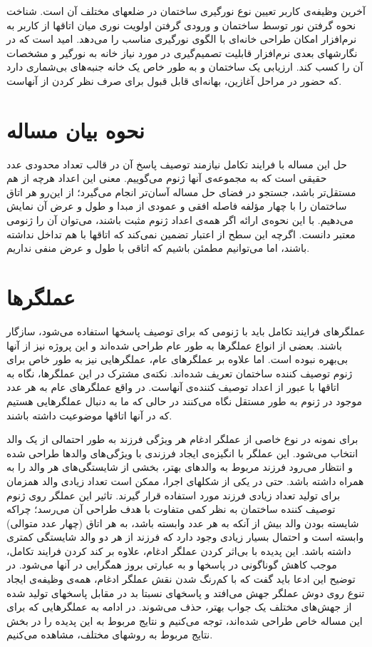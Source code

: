 \documentclass{report}
\begin{document}
آخرین وظیفه‌ی کاربر تعیین نوع نورگیری ساختمان در ضلعهای مختلف آن است. شناخت نحوه گرفتن نور توسط ساختمان و ورودی گرفتن اولویت نوری میان اتاقها از کاربر به نرم‌افزار امکان طراحی خانه‌ای با الگوی نورگیری مناسب را می‌دهد. امید است که در نگارشهای بعدی نرم‌افزار قابلیت تصمیم‌گیری در مورد نیاز خانه به نورگیر و مشخصات آن را کسب کند. ارزیابی یک ساختمان و به طور خاص یک خانه جنبه‌های بی‌شماری دارد که حضور در مراحل آغازین، بهانه‌ای قابل قبول برای صرف نظر کردن از آنهاست.

\section{نحوه بیان مساله}
حل این مساله با فرایند تکامل نیازمند توصیف پاسخ آن در قالب تعداد محدودی عدد حقیقی است که به مجموعه‌ی آنها ژنوم می‌گوییم. معنی این اعداد هرچه از هم مستقل‌تر باشد، جستجو در فضای حل مساله آسان‌تر انجام می‌گیرد؛ از این‌رو هر اتاق ساختمان را با چهار مؤلفه فاصله افقی و عمودی از مبدا و طول و عرض آن نمایش می‌دهیم. با این نحوه‌ی ارائه اگر همه‌ی اعداد ژنوم مثبت باشند، می‌توان آن را ژنومی معتبر دانست. اگرچه این سطح از اعتبار تضمین نمی‌کند که اتاقها با هم تداخل نداشته باشند، اما می‌توانیم مطمئن باشیم که اتاقی با طول و عرض منفی نداریم.

\section{عملگرها}
عملگرهای فرایند تکامل باید با ژنومی که برای توصیف پاسخها استفاده می‌شود، سازگار باشند. بعضی از انواع عملگرها به طور عام طراحی شده‌اند و این پروژه نیز از آنها بی‌بهره نبوده است. اما علاوه بر عملگرهای عام، عملگرهایی نیز به طور خاص برای ژنوم توصیف کننده ساختمان تعریف شده‌اند. نکته‌ی مشترک در این عملگرها، نگاه به اتاقها با عبور از اعداد توصیف کننده‌ی آنهاست. در واقع عملگرهای عام به هر عدد موجود در ژنوم به طور مستقل نگاه می‌کنند در حالی که ما به دنبال عملگرهایی هستیم که در آنها اتاقها موضوعیت داشته باشند.

برای نمونه در نوع خاصی از عملگر ادغام هر ویژگی فرزند به طور احتمالی از یک والد انتخاب می‌شود. این عملگر با انگیزه‌ی ایجاد فرزندی با ویژگی‌های والدها طراحی شده و انتظار می‌رود فرزند مربوط به والدهای بهتر، بخشی از شایستگی‌های هر والد را به همراه داشته باشد. حتی در یکی از شکلهای اجرا، ممکن است تعداد زیادی والد همزمان برای تولید تعداد زیادی فرزند مورد استفاده قرار گیرند. تاثیر این عملگر روی ژنوم توصیف کننده ساختمان به نظر کمی متفاوت با هدف طراحی آن می‌رسد؛ چراکه شایسته بودن والد بیش از آنکه به هر عدد وابسته باشد، به هر اتاق (چهار عدد متوالی) وابسته است و احتمال بسیار زیادی وجود دارد که فرزند از هر دو والد شایستگی کمتری داشته باشد. این پدیده با بی‌اثر کردن عملگر ادغام، علاوه بر کند کردن فرایند تکامل، موجب کاهش گوناگونی در پاسخها و به عبارتی بروز همگرایی در آنها می‌شود. در توضیح این ادعا باید گفت که با کم‌رنگ شدن نقش عملگر ادغام، همه‌ی وظیفه‌ی ایجاد تنوع روی دوش عملگر جهش می‌افتد و پاسخهای نسبتا بد در مقابل پاسخهای تولید شده از جهش‌های مختلف یک جواب بهتر، حذف می‌شوند. در ادامه به عملگرهایی که برای این مساله خاص طراحی شده‌اند، توجه می‌کنیم و نتایج مربوط به این پدیده را در بخش نتایج مربوط به روشهای مختلف، مشاهده می‌کنیم.
\end{document}

